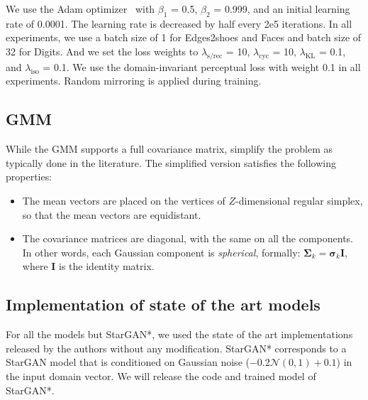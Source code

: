 \documentclass[runningheads]{llncs}
\begin{document}
We use the Adam optimizer~\cite{kingma2014adam} with $\beta_1$ = 0.5, $\beta_2$ = 0.999, and an initial learning rate of 0.0001. The learning rate is decreased by half every 2e5 iterations. In all experiments, we use a batch size of 1 for Edges2shoes and Faces and batch size of 32 for Digits. And we set the loss weights to $\lambda_{\text{s/rec}}$ = 10, $\lambda_{\text{cyc}}$ = 10, $\lambda_{\text{KL}}$ = 0.1, and $\lambda_{\text{iso}}$ = 0.1. We use the domain-invariant perceptual loss with weight 0.1 in all experiments. Random mirroring is applied during training.

\subsection{GMM}
While the GMM supports a full covariance matrix, simplify the problem as typically done in the literature. The simplified version satisfies the following properties:
\begin{itemize}
    \item The mean vectors are placed on the vertices of $Z$-dimensional regular simplex, so that the mean vectors are equidistant. 
    \item The covariance matrices are diagonal, with the same on all the components. In other words, each Gaussian component is \textit{spherical}, formally: $\pmb{\Sigma}_k = \pmb{\sigma}_k\mathbf{I}$, where $\mathbf{I}$ is the identity matrix.
\end{itemize}

\subsection{Implementation of state of the art models}
For all the models but StarGAN*, we used the state of the art implementations released by the authors without any modification. StarGAN* corresponds to a StarGAN model that is conditioned on Gaussian noise ($-0.2 \mathcal{N}(0,1) + 0.1$) in the input domain vector.
We will release the code and trained model of StarGAN*. 
\end{document}
